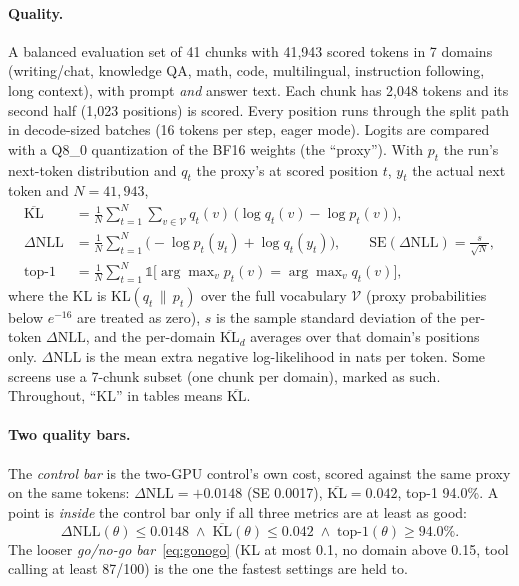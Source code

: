 \documentclass[11pt]{article}
\newcommand{\KL}{\mathrm{KL}}
\newcommand{\dNLL}{\Delta\mathrm{NLL}}
\begin{document}
\paragraph{Quality.} A balanced evaluation set of 41 chunks with 41,943 scored tokens in 7 domains (writing/chat,
knowledge QA, math, code, multilingual, instruction following, long context), with prompt \emph{and} answer text. Each
chunk has 2,048 tokens and its second half (1,023 positions) is scored. Every position runs through the split path in
decode-sized batches (16 tokens per step, eager mode). Logits are compared with a Q8\_0 quantization of the BF16 weights
(the ``proxy''). With $p_t$ the run's next-token distribution and $q_t$ the proxy's at scored position $t$, $y_t$ the
actual next token and $N = 41{,}943$,
\begin{align}
  \overline{\KL} &= \frac{1}{N}\sum_{t=1}^{N} \sum_{v\in\mathcal{V}} q_t(v)\,\big(\log q_t(v) - \log p_t(v)\big), \label{eq:kl}\\
  \dNLL &= \frac{1}{N}\sum_{t=1}^{N} \big(-\log p_t(y_t) + \log q_t(y_t)\big), \qquad
  \mathrm{SE}(\dNLL) = \frac{s}{\sqrt{N}}, \label{eq:dnll}\\
  \text{top-1} &= \frac{1}{N}\sum_{t=1}^{N} \mathbb{1}\big[\arg\max\nolimits_v p_t(v) = \arg\max\nolimits_v q_t(v)\big], \label{eq:top1}
\end{align}
where the KL is $\KL(q_t \,\|\, p_t)$ over the full vocabulary $\mathcal{V}$ (proxy probabilities below $e^{-16}$ are
treated as zero), $s$ is the sample standard deviation of the per-token $\dNLL$, and the per-domain
$\overline{\KL}_d$ averages over that domain's positions only. $\dNLL$ is the mean extra negative log-likelihood in nats
per token. Some screens use a 7-chunk subset (one chunk per domain), marked as such. Throughout, ``KL'' in tables means
$\overline{\KL}$.

\paragraph{Two quality bars.} The \emph{control bar} is the two-GPU control's own cost, scored against the same proxy on
the same tokens: $\dNLL = +0.0148$ (SE 0.0017), $\overline{\KL} = 0.042$, top-1 94.0\%. A point is \emph{inside} the
control bar only if all three metrics are at least as good:
\begin{equation}
  \dNLL(\theta) \le 0.0148 \;\wedge\; \overline{\KL}(\theta) \le 0.042 \;\wedge\; \text{top-1}(\theta) \ge 94.0\%.
  \label{eq:controlbar}
\end{equation}
The looser \emph{go/no-go bar}~\eqref{eq:gonogo} (KL at most 0.1, no domain above 0.15, tool calling at least 87/100) is
the one the fastest settings are held to.
\end{document}
